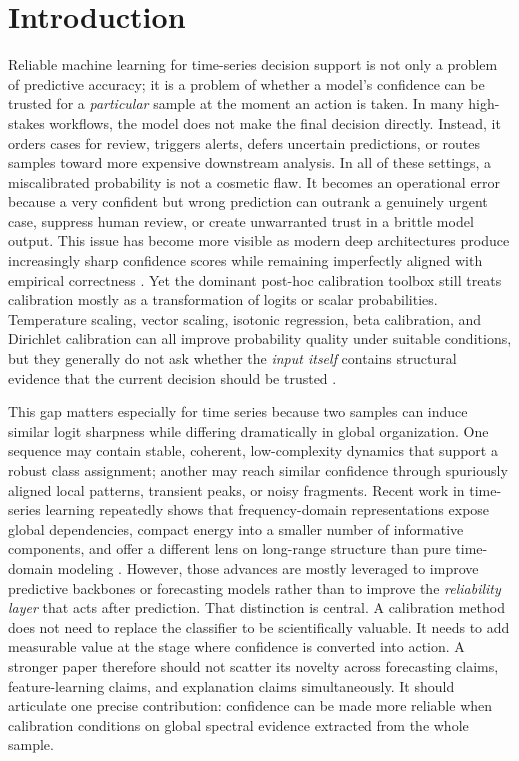 \documentclass{article}
\begin{document}
\section{Introduction}
Reliable machine learning for time-series decision support is not only a problem of predictive accuracy; it is a problem of whether a model's confidence can be trusted for a \emph{particular} sample at the moment an action is taken. In many high-stakes workflows, the model does not make the final decision directly. Instead, it orders cases for review, triggers alerts, defers uncertain predictions, or routes samples toward more expensive downstream analysis. In all of these settings, a miscalibrated probability is not a cosmetic flaw. It becomes an operational error because a very confident but wrong prediction can outrank a genuinely urgent case, suppress human review, or create unwarranted trust in a brittle model output. This issue has become more visible as modern deep architectures produce increasingly sharp confidence scores while remaining imperfectly aligned with empirical correctness \cite{guo2017calibration,tao2023benchmark,lecoz2024many}. Yet the dominant post-hoc calibration toolbox still treats calibration mostly as a transformation of logits or scalar probabilities. Temperature scaling, vector scaling, isotonic regression, beta calibration, and Dirichlet calibration can all improve probability quality under suitable conditions, but they generally do not ask whether the \emph{input itself} contains structural evidence that the current decision should be trusted \cite{guo2017calibration,kull2017beta,kull2019dirichlet}.

This gap matters especially for time series because two samples can induce similar logit sharpness while differing dramatically in global organization. One sequence may contain stable, coherent, low-complexity dynamics that support a robust class assignment; another may reach similar confidence through spuriously aligned local patterns, transient peaks, or noisy fragments. Recent work in time-series learning repeatedly shows that frequency-domain representations expose global dependencies, compact energy into a smaller number of informative components, and offer a different lens on long-range structure than pure time-domain modeling \cite{wu2023timesnet,nie2023patchtst,liu2024itransformer,yi2023frets,yi2024filternet,yang2024fbm}. However, those advances are mostly leveraged to improve predictive backbones or forecasting models rather than to improve the \emph{reliability layer} that acts after prediction. That distinction is central. A calibration method does not need to replace the classifier to be scientifically valuable. It needs to add measurable value at the stage where confidence is converted into action. A stronger paper therefore should not scatter its novelty across forecasting claims, feature-learning claims, and explanation claims simultaneously. It should articulate one precise contribution: confidence can be made more reliable when calibration conditions on global spectral evidence extracted from the whole sample.
\end{document}
